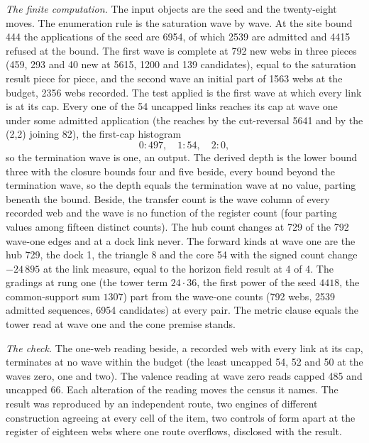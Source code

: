\begin{chproof}
\textit{The finite computation.} The input objects are the seed and the twenty-eight moves. The enumeration rule is the saturation wave by wave. At the site bound 444 the applications of the seed are 6954, of which 2539 are admitted and 4415 refused at the bound. The first wave is complete at 792 new webs in three pieces (459, 293 and 40 new at 5615, 1200 and 139 candidates), equal to the saturation result piece for piece, and the second wave an initial part of 1563 webs at the budget, 2356 webs recorded. The test applied is the first wave at which every link is at its cap. Every one of the 54 uncapped links reaches its cap at wave one under some admitted application (the reaches by the cut-reversal 5641 and by the (2,2) joining 82), the first-cap histogram
\begin{equation}
0{:}497,\quad 1{:}54,\quad 2{:}0 ,
\end{equation}
so the termination wave is one, an output. The derived depth is the lower bound three with the closure bounds four and five beside, every bound beyond the termination wave, so the depth equals the termination wave at no value, parting beneath the bound. Beside, the transfer count is the wave column of every recorded web and the wave is no function of the register count (four parting values among fifteen distinct counts). The hub count changes at 729 of the 792 wave-one edges and at a dock link never. The forward kinds at wave one are the hub 729, the dock 1, the triangle 8 and the core 54 with the signed count change $-24\,895$ at the link measure, equal to the horizon field result at 4 of 4. The gradings at rung one (the tower term $24\cdot 36$, the first power of the seed $4418$, the common-support sum $1307$) part from the wave-one counts (792 webs, 2539 admitted sequences, 6954 candidates) at every pair. The metric clause equals the tower read at wave one and the cone premise stands.

\textit{The check.} The one-web reading beside, a recorded web with every link at its cap, terminates at no wave within the budget (the least uncapped 54, 52 and 50 at the waves zero, one and two). The valence reading at wave zero reads capped 485 and uncapped 66. Each alteration of the reading moves the census it names. The result was reproduced by an independent route, two engines of different construction agreeing at every cell of the item, two controls of form apart at the register of eighteen webs where one route overflows, disclosed with the result.
\end{chproof}

